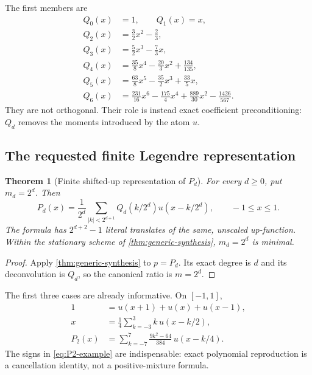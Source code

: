 \documentclass[11pt,oneside]{article}
\numberwithin{equation}{section}
\newtheorem{theorem}{Theorem}[section]
\theoremstyle{definition}
\theoremstyle{remark}
\begin{document}
The first members are
\begin{align}
 Q_0(x)&=1,\qquad Q_1(x)=x,\label{eq:Q01}\\
 Q_2(x)&=\frac32x^2-\frac23,\label{eq:Q2}\\
 Q_3(x)&=\frac52x^3-\frac73x,\label{eq:Q3}\\
 Q_4(x)&=\frac{35}{8}x^4-\frac{20}{3}x^2+\frac{134}{135},\label{eq:Q4}\\
 Q_5(x)&=\frac{63}{8}x^5-\frac{35}{2}x^3+\frac{33}{5}x,\label{eq:Q5}\\
 Q_6(x)&=\frac{231}{16}x^6-\frac{175}{4}x^4
        +\frac{889}{30}x^2-\frac{1426}{567}.
 \label{eq:Q6}
\end{align}
They are not orthogonal.  Their role is instead exact coefficient
preconditioning: $Q_d$ removes the moments introduced by the atom $u$.

\subsection{The requested finite Legendre representation}

\begin{theorem}[Finite shifted-up representation of $P_d$]
\label{thm:Pd-synthesis}
For every $d\ge0$, put $m_d=2^d$.  Then
\begin{equation}
 \boxed{
 P_d(x)=\frac1{2^d}
 \sum_{|k|<2^{d+1}}Q_d(k/2^d)u(x-k/2^d),
 \qquad -1\le x\le1.}
 \label{eq:Pd-synthesis}
\end{equation}
The formula has $2^{d+2}-1$ literal translates of the same, unscaled
up-function.  Within the stationary scheme of \cref{thm:generic-synthesis},
$m_d=2^d$ is minimal.
\end{theorem}

\begin{proof}
Apply \cref{thm:generic-synthesis} to $p=P_d$.  Its exact degree is $d$ and its
deconvolution is $Q_d$, so the canonical ratio is $m=2^d$.
\end{proof}

The first three cases are already informative.  On $[-1,1]$,
\begin{align}
 1&=u(x+1)+u(x)+u(x-1),
 \label{eq:P0-example}\\
 x&=\frac14\sum_{k=-3}^{3}k\,u(x-k/2),
 \label{eq:P1-example}\\
 P_2(x)&=\sum_{k=-7}^{7}
 \frac{9k^2-64}{384}\,u(x-k/4).
 \label{eq:P2-example}
\end{align}
The signs in \eqref{eq:P2-example} are indispensable: exact polynomial
reproduction is a cancellation identity, not a positive-mixture formula.
\end{document}
